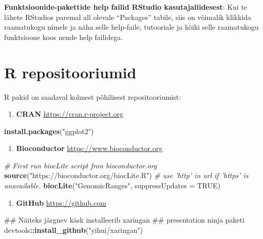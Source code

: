 \documentclass[]{book}
\newenvironment{Shaded}{\begin{snugshade}}{\end{snugshade}}
\newcommand{\KeywordTok}[1]{\textcolor[rgb]{0.13,0.29,0.53}{\textbf{#1}}}
\newcommand{\DataTypeTok}[1]{\textcolor[rgb]{0.13,0.29,0.53}{#1}}
\newcommand{\StringTok}[1]{\textcolor[rgb]{0.31,0.60,0.02}{#1}}
\newcommand{\CommentTok}[1]{\textcolor[rgb]{0.56,0.35,0.01}{\textit{#1}}}
\newcommand{\OtherTok}[1]{\textcolor[rgb]{0.56,0.35,0.01}{#1}}
\newcommand{\OperatorTok}[1]{\textcolor[rgb]{0.81,0.36,0.00}{\textbf{#1}}}
\newcommand{\NormalTok}[1]{#1}
\providecommand{\tightlist}{%
  \setlength{\itemsep}{0pt}\setlength{\parskip}{0pt}}
\begin{document}
\textbf{Funktsioonide-pakettide help failid RStudio kasutajaliidesest}:
Kui te lähete RStudios paremal all olevale ``Packages'' tabile, siis on
võimalik klikkida raamatukogu nimele ja näha selle help-faile,
tutooriale ja kõiki selle raamatukogu funktsioone koos nende help
failidega.

\section{R repositooriumid}\label{r-repositooriumid}

R pakid on saadaval kolmest põhilisest repositooriumist:

\begin{enumerate}
\def\labelenumi{\arabic{enumi}.}
\tightlist
\item
  \textbf{CRAN} \url{https://cran.r-project.org}
\end{enumerate}

\begin{Shaded}
\begin{Highlighting}[]
\KeywordTok{install.packages}\NormalTok{(}\StringTok{"ggplot2"}\NormalTok{)}
\end{Highlighting}
\end{Shaded}

\begin{enumerate}
\def\labelenumi{\arabic{enumi}.}
\setcounter{enumi}{1}
\tightlist
\item
  \textbf{Bioconductor} \url{https://www.bioconductor.org}
\end{enumerate}

\begin{Shaded}
\begin{Highlighting}[]
\CommentTok{# First run biocLite script fron bioconductor.org}
\KeywordTok{source}\NormalTok{(}\StringTok{"https://bioconductor.org/biocLite.R"}\NormalTok{)  }
\CommentTok{# use 'http' in url if 'https' is unavailable. }
\KeywordTok{biocLite}\NormalTok{(}\StringTok{"GenomicRanges"}\NormalTok{, }\DataTypeTok{suppressUpdates =} \OtherTok{TRUE}\NormalTok{)}
\end{Highlighting}
\end{Shaded}

\begin{enumerate}
\def\labelenumi{\arabic{enumi}.}
\setcounter{enumi}{2}
\tightlist
\item
  \textbf{GitHub} \url{https://github.com}
\end{enumerate}

\begin{Shaded}
\begin{Highlighting}[]
\NormalTok{## Näiteks järgnev käsk installeerib xaringan }
\NormalTok{## presentation ninja paketi}
\NormalTok{devtools}\OperatorTok{::}\KeywordTok{install_github}\NormalTok{(}\StringTok{"yihui/xaringan"}\NormalTok{)}
\end{Highlighting}
\end{Shaded}
\end{document}
